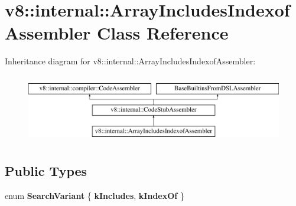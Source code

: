 \hypertarget{classv8_1_1internal_1_1ArrayIncludesIndexofAssembler}{}\section{v8\+:\+:internal\+:\+:Array\+Includes\+Indexof\+Assembler Class Reference}
\label{classv8_1_1internal_1_1ArrayIncludesIndexofAssembler}
Inheritance diagram for v8\+:\+:internal\+:\+:Array\+Includes\+Indexof\+Assembler\+:\begin{figure}[H]
\begin{center}
\leavevmode
\includegraphics[height=3.000000cm]{classv8_1_1internal_1_1ArrayIncludesIndexofAssembler}
\end{center}
\end{figure}
\subsection*{Public Types}
\begin{DoxyCompactItemize}
\item 
\mbox{\label{classv8_1_1internal_1_1ArrayIncludesIndexofAssembler_a1ec088d244c247129bcc42e4042ebcfa}} 
enum {\bfseries Search\+Variant} \{ {\bfseries k\+Includes}, 
{\bfseries k\+Index\+Of}
 \}
\end{DoxyCompactItemize}
